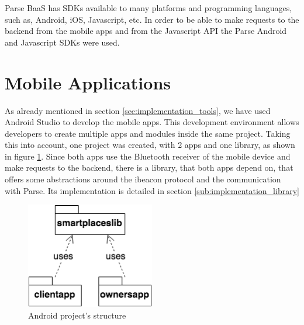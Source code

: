 Parse \gls{BaaS} has \glspl{SDK} available to many platforms and programming
languages, such as, Android, iOS, Javascript, etc.
In order to be able to make requests to the backend from the mobile apps and
from the Javascript API
the Parse Android and Javascript \glspl{SDK} were used.

\section{Mobile Applications}
\label{sec:implementation_mobile_applications}
As already mentioned in section \ref{sec:implementation_tools}, we have used Android Studio to develop the mobile apps.
This development environment allows developers to create multiple
apps and modules inside the same project.
Taking this into account,
one project was created, with 2 apps and one library, as shown in figure
\ref{fig:smartplaces_package}. Since both apps use the Bluetooth receiver
of the mobile device and make requests to the backend, there is a library,
that both apps depend on, that offers some abstractions around the ibeacon
protocol and the communication with Parse.
Its implementation is detailed in section \ref{sub:implementation_library}

\begin{figure}[!ht]
  \centering
    \includegraphics[width=0.5\textwidth, height=0.15\textheight,
      keepaspectratio]{images/smartplaces_package}
    \caption[Android project structure]{Android project's structure}
    \label{fig:smartplaces_package}
\end{figure}

